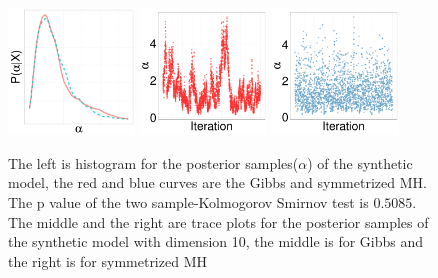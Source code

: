 {  \begin{figure}[H]
  \centering
  \begin{minipage}[!hp]{0.97\linewidth}
    \includegraphics [width=0.30\textwidth, angle=0]{figs/EXP_ks/exp_hist_44_05_10_.pdf}
    \includegraphics [width=0.30\textwidth, angle=0]{figs/EXP_ks/exp_traceGBS_44_05_10_.pdf}
    \includegraphics [width=0.30\textwidth, angle=0]{figs/EXP_ks/exp_traceMH_44_05_10_.pdf}
  \end{minipage}

    \caption{The left is histogram for the posterior samples($\alpha$) of the synthetic model, the red and blue curves are the Gibbs and symmetrized MH. The p value of the two sample-Kolmogorov Smirnov test is $0.5085$. The middle and the right are trace plots for the posterior samples of the synthetic model with dimension 10, the middle is for Gibbs and the right is for symmetrized MH}
     \label{fig:TRACE_EXP}
  \end{figure}

}
